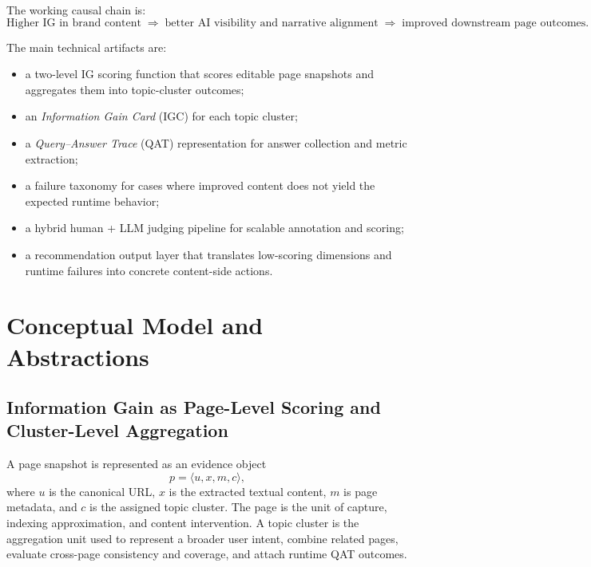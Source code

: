 \documentclass{article}
\begin{document}
The working causal chain is:
\[
\text{Higher IG in brand content}
\;\Rightarrow\;
\text{better AI visibility and narrative alignment}
\;\Rightarrow\;
\text{improved downstream page outcomes}.
\]

The main technical artifacts are:
\begin{itemize}
    \item a two-level IG scoring function that scores editable page snapshots and aggregates them into topic-cluster outcomes;
    \item an \emph{Information Gain Card} (IGC) for each topic cluster;
    \item a \emph{Query--Answer Trace} (QAT) representation for answer collection and metric extraction;
    \item a failure taxonomy for cases where improved content does not yield the expected runtime behavior;
    \item a hybrid human + LLM judging pipeline for scalable annotation and scoring;
    \item a recommendation output layer that translates low-scoring dimensions and runtime failures into concrete content-side actions.
\end{itemize}

\section{Conceptual Model and Abstractions}

\subsection{Information Gain as Page-Level Scoring and Cluster-Level Aggregation}
\label{sec:igscores}

A page snapshot is represented as an evidence object
\[
p = \langle u, x, m, c \rangle,
\]
where \(u\) is the canonical URL, \(x\) is the extracted textual content, \(m\) is page metadata, and \(c\) is the assigned topic cluster. The page is the unit of capture, indexing approximation, and content intervention. A topic cluster is the aggregation unit used to represent a broader user intent, combine related pages, evaluate cross-page consistency and coverage, and attach runtime QAT outcomes.
\end{document}
